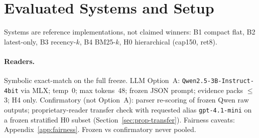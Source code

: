 \section{Evaluated Systems and Setup}
\label{sec:systems}
\label{sec:setup}

Systems are reference implementations, not claimed winners: B1 compact flat, B2 latest-only, B3 recency-$k$, B4 BM25-$k$, H0 hierarchical (cap150, ret8).

\paragraph{Readers.} Symbolic exact-match on the full freeze. LLM Option~A: \texttt{Qwen2.5-3B-Instruct-4bit} via MLX; temp~$0$; max tokens~$48$; frozen JSON prompt; evidence packs $\le$3; H4 only. Confirmatory (not Option~A): parser re-scoring of frozen Qwen raw outputs; proprietary-reader transfer check with requested alias \texttt{gpt-4.1-mini} on a frozen stratified H0 subset (Section~\ref{sec:prop-transfer}). Fairness caveats: Appendix~\ref{app:fairness}. Frozen vs confirmatory never pooled.

